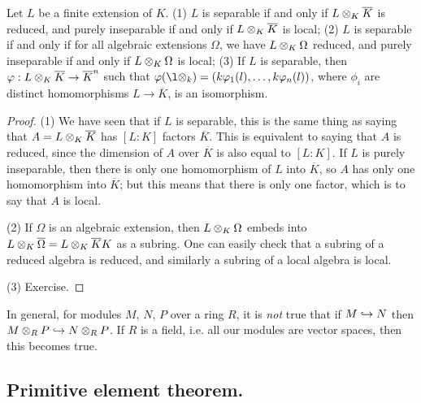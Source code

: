\begin{thm}
Let $L$ be a finite extension of $K$.
(1) $L$ is separable if and only if $L \otimes_{K} \overline{K}$ is reduced, and purely inseparable if and only if $L \otimes_{K} \overline{K}$ is local;
(2) $L$ is separable if and only if for all algebraic extensions $\Omega$, we have $L \otimes_{K} \Omega$ reduced, and purely inseparable if and only if $L \otimes_{K} \Omega$ is local;
(3) If $L$ is separable, then $\varphi: L\otimes_{K} \overline{K} \to \overline{K}^n$ such that $\phi(\l \tensor k) = ( k \phi_1(l), \dotsc, k \phi_n(l) )$, where $\phi_i$ are distinct homomorphisms $L \to \overline{K}$, is an isomorphism.
\end{thm}
\begin{proof}
(1) We have seen that if $L$ is separable, this is the same thing as saying that $A = L \otimes_{K} \overline{K}$ has $[L:K]$ factors $\overline{K}$. 
This is equivalent to saying that $A$ is reduced, since the dimension of $A$ over $\overline{K}$ is also equal to $[L : K]$.
If $L$ is purely inseparable, then there is only one homomorphism of $L$ into $\overline{K}$, so $A$ has only one homomorphism into $\overline{K}$; but this means that there is only one factor, which is to say that $A$ is local.

(2) If $\Omega$ is an algebraic extension, then $L \otimes_{K} \Omega$ embeds into $L \otimes_{K} \overline{\Omega} = L \otimes_{K} \overline{K}K$ as a subring. 
One can easily check that a subring of a reduced algebra is reduced, and similarly a subring of a local algebra is local.

(3) Exercise.
\end{proof}

\begin{rmk}
In general, for modules $M$, $N$, $P$ over a ring $R$, it is \emph{not} true that if $M \hookrightarrow N$ then $M \otimes_{R} P \hookrightarrow N \otimes_{R} P$. 
If $R$ is a field, i.e. all our modules are vector spaces, then this becomes true.
\end{rmk}

\subsection{Primitive element theorem.}

